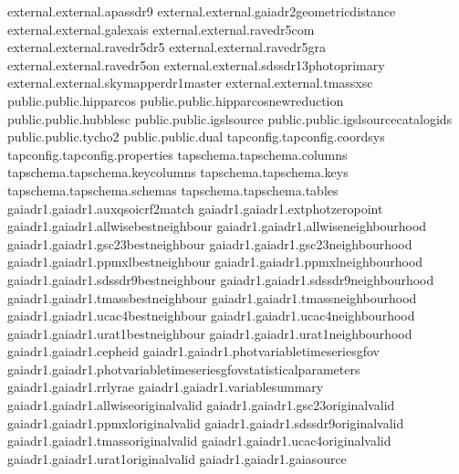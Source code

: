 \documentclass[letterpaper,10pt,english]{sphinxmanual}
\begin{document}
\begin{sphinxVerbatim}[commandchars=\\\{\}]
external.external.apassdr9
external.external.gaiadr2\PYGZus{}geometric\PYGZus{}distance
external.external.galex\PYGZus{}ais
external.external.ravedr5\PYGZus{}com
external.external.ravedr5\PYGZus{}dr5
external.external.ravedr5\PYGZus{}gra
external.external.ravedr5\PYGZus{}on
external.external.sdssdr13\PYGZus{}photoprimary
external.external.skymapperdr1\PYGZus{}master
external.external.tmass\PYGZus{}xsc
public.public.hipparcos
public.public.hipparcos\PYGZus{}newreduction
public.public.hubble\PYGZus{}sc
public.public.igsl\PYGZus{}source
public.public.igsl\PYGZus{}source\PYGZus{}catalog\PYGZus{}ids
public.public.tycho2
public.public.dual
tap\PYGZus{}config.tap\PYGZus{}config.coord\PYGZus{}sys
tap\PYGZus{}config.tap\PYGZus{}config.properties
tap\PYGZus{}schema.tap\PYGZus{}schema.columns
tap\PYGZus{}schema.tap\PYGZus{}schema.key\PYGZus{}columns
tap\PYGZus{}schema.tap\PYGZus{}schema.keys
tap\PYGZus{}schema.tap\PYGZus{}schema.schemas
tap\PYGZus{}schema.tap\PYGZus{}schema.tables
gaiadr1.gaiadr1.aux\PYGZus{}qso\PYGZus{}icrf2\PYGZus{}match
gaiadr1.gaiadr1.ext\PYGZus{}phot\PYGZus{}zero\PYGZus{}point
gaiadr1.gaiadr1.allwise\PYGZus{}best\PYGZus{}neighbour
gaiadr1.gaiadr1.allwise\PYGZus{}neighbourhood
gaiadr1.gaiadr1.gsc23\PYGZus{}best\PYGZus{}neighbour
gaiadr1.gaiadr1.gsc23\PYGZus{}neighbourhood
gaiadr1.gaiadr1.ppmxl\PYGZus{}best\PYGZus{}neighbour
gaiadr1.gaiadr1.ppmxl\PYGZus{}neighbourhood
gaiadr1.gaiadr1.sdss\PYGZus{}dr9\PYGZus{}best\PYGZus{}neighbour
gaiadr1.gaiadr1.sdss\PYGZus{}dr9\PYGZus{}neighbourhood
gaiadr1.gaiadr1.tmass\PYGZus{}best\PYGZus{}neighbour
gaiadr1.gaiadr1.tmass\PYGZus{}neighbourhood
gaiadr1.gaiadr1.ucac4\PYGZus{}best\PYGZus{}neighbour
gaiadr1.gaiadr1.ucac4\PYGZus{}neighbourhood
gaiadr1.gaiadr1.urat1\PYGZus{}best\PYGZus{}neighbour
gaiadr1.gaiadr1.urat1\PYGZus{}neighbourhood
gaiadr1.gaiadr1.cepheid
gaiadr1.gaiadr1.phot\PYGZus{}variable\PYGZus{}time\PYGZus{}series\PYGZus{}gfov
gaiadr1.gaiadr1.phot\PYGZus{}variable\PYGZus{}time\PYGZus{}series\PYGZus{}gfov\PYGZus{}statistical\PYGZus{}parameters
gaiadr1.gaiadr1.rrlyrae
gaiadr1.gaiadr1.variable\PYGZus{}summary
gaiadr1.gaiadr1.allwise\PYGZus{}original\PYGZus{}valid
gaiadr1.gaiadr1.gsc23\PYGZus{}original\PYGZus{}valid
gaiadr1.gaiadr1.ppmxl\PYGZus{}original\PYGZus{}valid
gaiadr1.gaiadr1.sdssdr9\PYGZus{}original\PYGZus{}valid
gaiadr1.gaiadr1.tmass\PYGZus{}original\PYGZus{}valid
gaiadr1.gaiadr1.ucac4\PYGZus{}original\PYGZus{}valid
gaiadr1.gaiadr1.urat1\PYGZus{}original\PYGZus{}valid
gaiadr1.gaiadr1.gaia\PYGZus{}source

\end{sphinxVerbatim}
\end{document}
